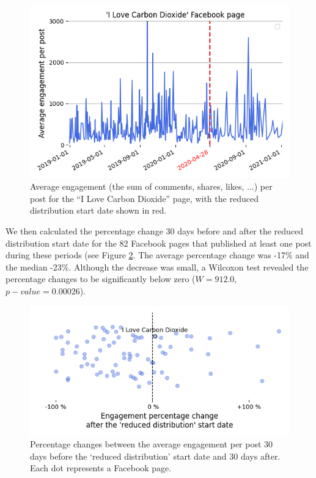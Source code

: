 \documentclass[11pt,a4paper]{article}
\begin{document}
\begin{figure}[!h]
\centering
\includegraphics[width=\linewidth]{./../figure/reduce_example_timeseries.png}
\caption{Average engagement (the sum of comments, shares, likes, ...) per post for the “I Love Carbon Dioxide” page, with the reduced distribution start date shown in red.}
\label{reduce_example_timeseries}
\end{figure}

We then calculated the percentage change 30 days before and after the reduced distribution start date for the 82 Facebook pages that published at least one post during these periods (see Figure \ref{reduce_percentage_change}. The average percentage change was -17\% and the median -23\%. Although the decrease was small, a Wilcoxon test revealed the percentage changes to be significantly below zero ($W = 912.0$, $p-value = 0.00026$).

\begin{figure}[!h]
\centering
\includegraphics[width=\linewidth]{./../figure/reduce_percentage_change.png}
\caption{Percentage changes between the average engagement per post 30 days before the `reduced distribution' start date and 30 days after. Each dot represents a Facebook page.}
\label{reduce_percentage_change}
\end{figure}
\end{document}
